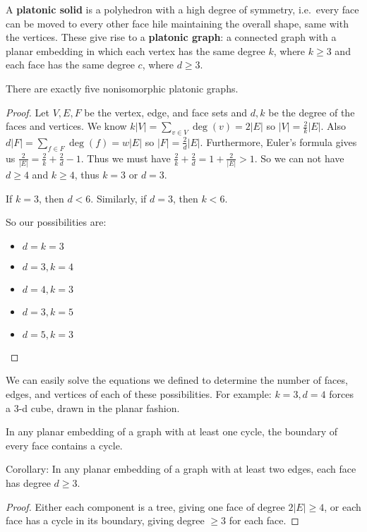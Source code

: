 \documentclass[12pt]{article}
\begin{document}
A {\bf platonic solid} is a polyhedron with a high degree of symmetry, i.e.\ every face can be moved to every other face hile maintaining the overall shape, same with the vertices. These give rise to a {\bf platonic graph}: a connected graph with a planar embedding in which each vertex has the same degree $k$, where $k\geq 3$ and each face has the same degree $c$, where $d\geq 3$.

\begin{theorem}
There are exactly five nonisomorphic platonic graphs.
\end{theorem}

\begin{proof}
Let $V, E, F$ be the vertex, edge, and face sets and $d, k$ be the degree of the faces and vertices. We know $k|V| = \displaystyle\sum_{v\in V} \deg(v) = 2|E|$ so $|V| = \frac{2}{k}|E|$. Also $d|F| = \displaystyle\sum_{f\in F} \deg(f) = w|E|$ so $|F| = \frac{2}{d}|E|$. Furthermore, Euler's formula gives us $\frac{2}{|E|} = \frac{2}{k} + \frac{2}{d} - 1$. Thus we must have $\frac{2}{k} + \frac{2}{d} = 1 + \frac{2}{|E|} > 1$. So we can not have $d \geq 4$ and $k \geq 4$, thus $k = 3$ or $d = 3$.

If $k = 3$, then $d < 6$. Similarly, if $d = 3$, then $k < 6$.

So our possibilities are:
\begin{itemize}
\item $d = k = 3$
\item $d = 3, k = 4$
\item $d = 4, k = 3$
\item $d = 3, k = 5$
\item $d = 5, k = 3$
\end{itemize}
\end{proof}

We can easily solve the equations we defined to determine the number of faces, edges, and vertices of each of these possibilities. For example: $k = 3, d = 4$ forces a 3-d cube, drawn in the planar fashion.

\begin{lemma}
In any planar embedding of a graph with at least one cycle, the boundary of every face contains a cycle.
\end{lemma}

Corollary: In any planar embedding of a graph with at least two edges, each face has degree $d \geq 3$.

\begin{proof}
Either each component is a tree, giving one face of degree $2|E| \geq 4$, or each face has a cycle in its boundary, giving degree $\geq 3$ for each face.
\end{proof}
\end{document}
